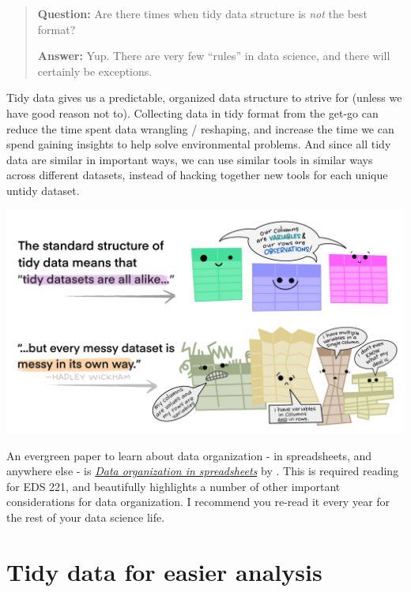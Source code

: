\documentclass[
]{book}
\begin{document}
\begin{quote}
\textbf{Question:} Are there times when tidy data structure is \emph{not} the best format?

\textbf{Answer:} Yup. There are very few ``rules'' in data science, and there will certainly be exceptions.
\end{quote}

Tidy data gives us a predictable, organized data structure to strive for (unless we have good reason not to). Collecting data in tidy format from the get-go can reduce the time spent data wrangling / reshaping, and increase the time we can spend gaining insights to help solve environmental problems. And since all tidy data are similar in important ways, we can use similar tools in similar ways across different datasets, instead of hacking together new tools for each unique untidy dataset.

\includegraphics[width=6.26042in,height=\textheight]{images/tidydata_2.jpg}

An evergreen paper to learn about data organization - in spreadsheets, and anywhere else - is \href{https://www-tandfonline-com.proxy.library.ucsb.edu:9443/doi/full/10.1080/00031305.2017.1375989}{\emph{Data organization in spreadsheets}} by \citet{broman_data_2018}. This is required reading for EDS 221, and beautifully highlights a number of other important considerations for data organization. I recommend you re-read it every year for the rest of your data science life.

\hypertarget{tidy-data-for-easier-analysis}{%
\section{Tidy data for easier analysis}\label{tidy-data-for-easier-analysis}}
\end{document}
